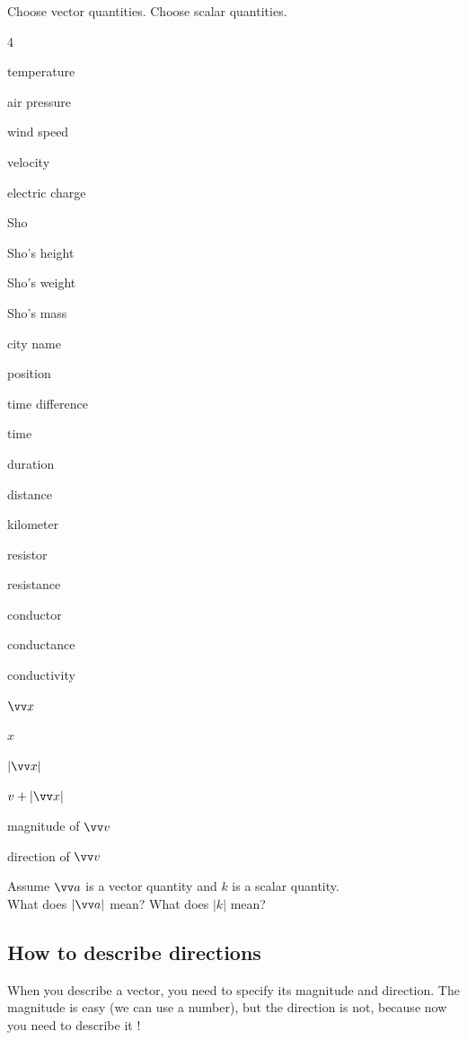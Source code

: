 \documentclass[11pt,pdfa,lastpage]{MishoNote}
\begin{document}
\begin{quizzes}
  \Quiz[S] Choose vector quantities. Choose scalar quantities.
  \begin{menumerate}[labelsep=0em,labelwidth=0em,itemindent=1em,label={},leftmargin=0.3em]{4}
    \item temperature
    \item air pressure
    \item wind speed
    \item velocity
    \item electric charge
    \item Sho
    \item Sho's height
    \item Sho's weight
    \item Sho's mass
    \item city name
    \item position
    \item time difference
    \item time
    \item duration
    \item distance
    \item kilometer
    \item resistor
    \item resistance
    \item conductor
    \item conductance
    \item conductivity
    \item $\vc x$
    \item $x$
    \item $|\vc x|$
    \item $v+|\vc x|$
    \item magnitude of $\vc v$
    \item direction of $\vc v$
  \end{menumerate}
  \Quiz[S] Assume $\vc a$ is a vector quantity and $k$ is a scalar quantity.\\
  \TAB{} What does $|\vc a|$ mean?\qquad{} What does $|k|$ mean?\\
  \TAB\hfill{}
\end{quizzes}

\OutputNote

\subsection{How to describe directions}
When you describe a vector, you need to specify its magnitude and direction. The magnitude is easy (we can use a number), but the direction is not, because now you need to describe it !
\end{document}
